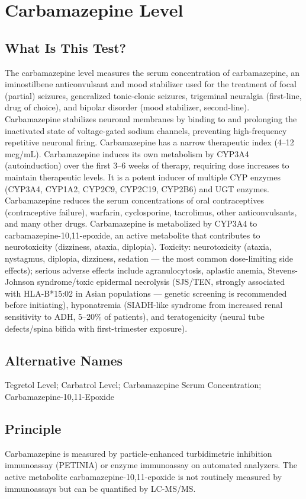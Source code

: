 \chapter{Carbamazepine Level}
\section*{What Is This Test?}
The carbamazepine level measures the serum concentration of carbamazepine, an iminostilbene anticonvulsant and mood stabilizer used for the treatment of focal (partial) seizures, generalized tonic-clonic seizures, trigeminal neuralgia (first-line, drug of choice), and bipolar disorder (mood stabilizer, second-line). Carbamazepine stabilizes neuronal membranes by binding to and prolonging the inactivated state of voltage-gated sodium channels, preventing high-frequency repetitive neuronal firing. Carbamazepine has a narrow therapeutic index (4--12 mcg/mL). Carbamazepine induces its own metabolism by CYP3A4 (autoinduction) over the first 3--6 weeks of therapy, requiring dose increases to maintain therapeutic levels. It is a potent inducer of multiple CYP enzymes (CYP3A4, CYP1A2, CYP2C9, CYP2C19, CYP2B6) and UGT enzymes. Carbamazepine reduces the serum concentrations of oral contraceptives (contraceptive failure), warfarin, cyclosporine, tacrolimus, other anticonvulsants, and many other drugs. Carbamazepine is metabolized by CYP3A4 to carbamazepine-10,11-epoxide, an active metabolite that contributes to neurotoxicity (dizziness, ataxia, diplopia). Toxicity: neurotoxicity (ataxia, nystagmus, diplopia, dizziness, sedation --- the most common dose-limiting side effects); serious adverse effects include agranulocytosis, aplastic anemia, Stevens-Johnson syndrome/toxic epidermal necrolysis (SJS/TEN, strongly associated with HLA-B*15:02 in Asian populations --- genetic screening is recommended before initiating), hyponatremia (SIADH-like syndrome from increased renal sensitivity to ADH, 5--20\% of patients), and teratogenicity (neural tube defects/spina bifida with first-trimester exposure).
\section*{Alternative Names}
Tegretol Level; Carbatrol Level; Carbamazepine Serum Concentration; Carbamazepine-10,11-Epoxide
\section*{Principle}
Carbamazepine is measured by particle-enhanced turbidimetric inhibition immunoassay (PETINIA) or enzyme immunoassay on automated analyzers. The active metabolite carbamazepine-10,11-epoxide is not routinely measured by immunoassays but can be quantified by LC-MS/MS.
